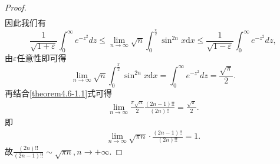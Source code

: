 \documentclass[../../main.tex]{subfiles}
\begin{document}
\begin{proof}
\begin{align*}
\end{align*}
因此我们有
\[
\frac{1}{\sqrt{1 + \varepsilon}}\int_{0}^{\infty}e^{-z^{2}}dz\leqslant\lim_{n\rightarrow\infty}\sqrt{n}\int_{0}^{\frac{\pi}{2}}\sin^{2n}x \mathrm{d}x\leqslant\frac{1}{\sqrt{1 - \varepsilon}}\int_{0}^{\infty}e^{-z^{2}}dz,
\]
由\(\varepsilon\)任意性即可得
\[
\lim_{n\rightarrow\infty}\sqrt{n}\int_{0}^{\frac{\pi}{2}}\sin^{2n}x \mathrm{d}x=\int_{0}^{\infty}e^{-z^{2}}dz=\frac{\sqrt{\pi}}{2}.
\]
再结合\eqref{theorem4.6-1.1}式可得
\begin{align*}
\lim_{n\rightarrow \infty} \frac{\pi \sqrt{n}}{2}\frac{(2n-1)!!}{(2n)!!}=\frac{\sqrt{\pi}}{2}.
\end{align*}
即
\begin{align*}
\lim_{n\rightarrow \infty} \sqrt{\pi n}\cdot \frac{(2n-1)!!}{(2n)!!}=1.
\end{align*}
故$\frac{(2n)!!}{(2n-1)!!}\sim \sqrt{\pi n},n\rightarrow +\infty $.
\end{proof}
\end{document}
